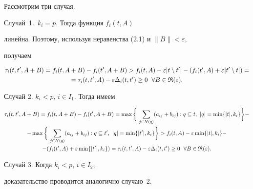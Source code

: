 \begin{pf} 


Рассмотрим три случая.





Случай~1.~$k_i=p$. Тогда функция $f_i(t,A)$ 


линейна. Поэтому, используя неравенства (2.1) и $\|B\|<\varepsilon$, 


получаем 


\begin{multline*} 


\tau_i(t,t',A+B)=f_i(t,A+B)-f_i(t',A+B)>f_i(t,A)- 


\varepsilon|t\setminus t'|-(f_i(t',A)+ 


\varepsilon|t'\setminus t|)= \\ 


% 


=\tau_i(t,t',A)-\varepsilon\Delta_i(t,t')\ge 0\ \; \forall 


B\in\frak R(\varepsilon). 


\end{multline*} 


 


Случай 2. $k_i<p$, $i\in I_1$. Тогда имеем 


\begin{multline*} 


\tau_i(t,t',A+B)=f_i(t,A+B)-f_i(t',A+B)= 


\max\bigg\{\,\sum_{j\in N(q)}(a_{ij}+b_{ij}): 


q\subseteq t,\ |q|=\min\{|t|,k_i\}\bigg\}- \\ 


% 


-\max\bigg\{\,\sum_{j\in N(q)}(a_{ij}+b_{ij}): 


q\subseteq t',\ |q|=\min\{|t'|,k_i\}\bigg\}>f_i(t,A)- 


\varepsilon\min\{|t|,k_i\}- \\ 


% 


-(f_i(t',A)+\varepsilon\min\{|t'|,k_i\})= 


\tau_i(t,t',A)-\varepsilon\Delta_i(t,t')\ge 0 


\ \;\forall B\in\frak R(\varepsilon). 


\end{multline*} 


 


Случай 3. Когда $k_i<p$, $i\in I_2$, 


доказательство проводится аналогично случаю~2. 


\end{pf} 


